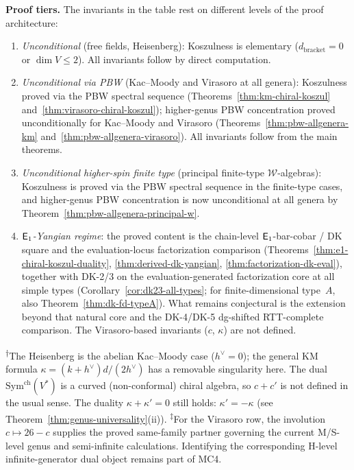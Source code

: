 \smallskip
\noindent\textbf{Proof tiers.}  The invariants in the table rest on
different levels of the proof architecture:

\begin{enumerate}
\item[\textbf{T1.}] \emph{Unconditional} (free fields, Heisenberg):
  Koszulness is elementary ($d_{\mathrm{bracket}} = 0$ or $\dim V \le 2$).
  All invariants follow by direct computation.
\item[\textbf{T1$\frac{1}{2}$.}] \emph{Unconditional via PBW}
  (Kac--Moody and Virasoro at all genera):
  Koszulness proved via the PBW spectral sequence
  (Theorems~\ref{thm:km-chiral-koszul}
  and~\ref{thm:virasoro-chiral-koszul}); higher-genus PBW concentration
  proved unconditionally for Kac--Moody and Virasoro
  (Theorems~\ref{thm:pbw-allgenera-km}
  and~\ref{thm:pbw-allgenera-virasoro}).
  All invariants follow from the main theorems.
\item[\textbf{T2.}] \emph{Unconditional higher-spin finite type}
  (principal finite-type $\mathcal{W}$-algebras):
  Koszulness is proved via the PBW spectral sequence in the finite-type
  cases, and higher-genus PBW concentration is now unconditional at all
  genera by Theorem~\ref{thm:pbw-allgenera-principal-w}.
\item[\textbf{DK-core.}] \emph{$\mathsf{E}_1$-Yangian regime}:
  the proved content is the chain-level $\mathsf{E}_1$-bar-cobar / DK square
  and the evaluation-locus factorization comparison
  \textup{(}Theorems~\ref{thm:e1-chiral-koszul-duality},
  \ref{thm:derived-dk-yangian}, \ref{thm:factorization-dk-eval}\textup{)},
  together with DK-2/3 on the evaluation-generated factorization core
  at all simple types
  \textup{(}Corollary~\ref{cor:dk23-all-types}; for finite-dimensional
  type~$A$, also Theorem~\ref{thm:dk-fd-typeA}\textup{)}.
  What remains conjectural is the extension beyond that natural core
  and the DK-4/DK-5 dg-shifted RTT-complete comparison.
  The Virasoro-based invariants ($c$, $\kappa$) are not defined.
\end{enumerate}

\smallskip
\noindent\textsuperscript{$\dagger$}The Heisenberg is the abelian Kac--Moody case ($h^\vee = 0$);
the general KM formula $\kappa = (k+h^\vee)d/(2h^\vee)$ has a removable singularity here.
The dual $\mathrm{Sym}^{\mathrm{ch}}(V^*)$ is a curved (non-conformal) chiral algebra,
so $c + c'$ is not defined in the usual sense.
The duality $\kappa + \kappa' = 0$ still holds: $\kappa' = -\kappa$
(see Theorem~\ref{thm:genus-universality}(ii)).
\textsuperscript{$\ddagger$}For the Virasoro row, the involution
$c \mapsto 26-c$ supplies the proved same-family partner governing the
current M/S-level genus and semi-infinite calculations.  Identifying the
corresponding H-level infinite-generator dual object remains part of
MC4.

